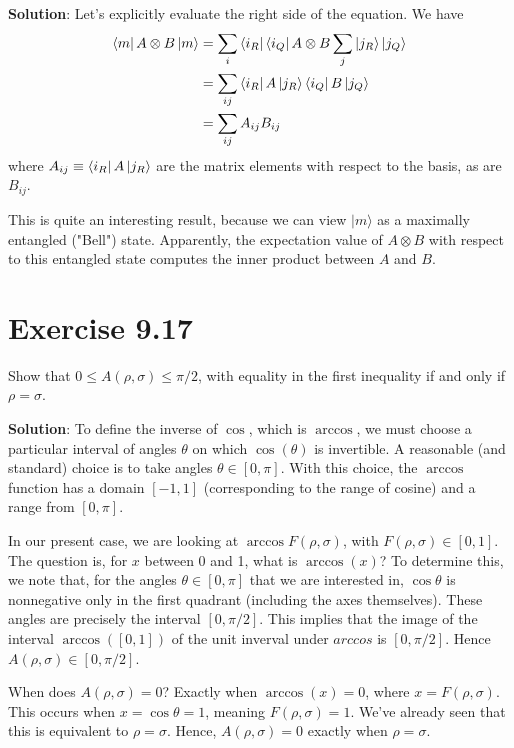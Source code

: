 \documentclass{book}
\begin{document}
    \textbf{Solution}: Let's explicitly evaluate the right side of the equation. We have
    \begin{align}
    \begin{aligned}
        \bra{m} A \otimes B \ket{m} &= \sum_{i} \bra{i_R}\bra{i_Q} A \otimes B \sum_j \ket{j_R}\ket{j_Q} \\
        &= \sum_{ij} \bra{i_R}A\ket{j_R} \bra{i_Q}B\ket{j_Q} \\
        &= \sum_{ij} A_{ij} B_{ij} 
    \end{aligned}
    \end{align}
    where $A_{ij} \equiv \bra{i_R}A\ket{j_R}$ are the matrix elements with respect to the basis, as are $B_{ij}$. 

    This is quite an interesting result, because we can view $\vert m \rangle$ as a maximally entangled ("Bell") state. Apparently, the expectation value of $A \otimes B$ with respect to this entangled state computes the inner  product between $A$ and $B$. 

\section*{Exercise 9.17}
    Show that $0 \leq A(\rho, \sigma) \leq \pi/2$, with equality in the first inequality if and only if $\rho = \sigma$.

    \textbf{Solution}: To define the inverse of $\cos$, which is $\arccos$, we must choose a particular interval of angles $\theta$ on which $\cos(\theta)$ is invertible. A reasonable (and standard) choice is to take angles $\theta \in [0,\pi]$. With this choice, the $\arccos$ function has a domain $[-1,1]$ (corresponding to the range of cosine) and a range from $[0,\pi]$.

    In our present case, we are looking at $\arccos F(\rho, \sigma)$, with $F(\rho, \sigma) \in [0,1]$. The question is, for $x$ between 0 and 1, what is $\arccos(x)$? To determine this, we note that, for the angles $\theta \in [0,\pi]$ that we are interested in, $\cos \theta$ is nonnegative only in the first quadrant (including the axes themselves). These angles are precisely the interval $[0,\pi/2]$. This implies that the image of the interval $\arccos ([0,1])$ of the unit inverval under $arccos$ is  $[0,\pi/2]$. Hence $A(\rho, \sigma) \in [0,\pi/2]$. 

    When does $A(\rho, \sigma) = 0$? Exactly when $\arccos(x) = 0$, where $x = F(\rho, \sigma)$. This occurs when $x = \cos\theta = 1$, meaning $F(\rho, \sigma) = 1$. We've already seen that this is equivalent to $\rho = \sigma$. Hence, $A(\rho, \sigma) = 0$ exactly when $\rho = \sigma$.
\end{document}
